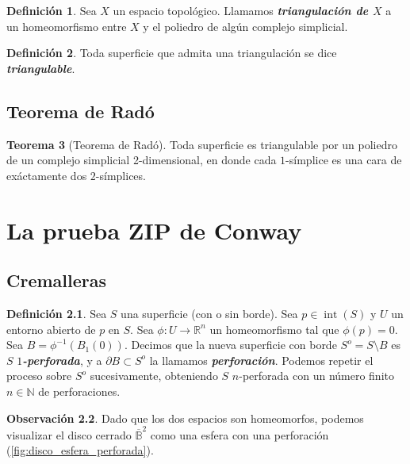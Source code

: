 \documentclass[10pt]{report}
\newcommand{\R}{\mathbb{R}}
\newcommand{\N}{\mathbb{N}}
\DeclareMathOperator{\interior}{int} %
\newcommand{\enfatiza}[1]{\textbf{\textit{#1}}}
\theoremstyle{definition}
\newtheorem{defin}{Definición}[section]
\newtheorem{tma}[defin]{Teorema}
\newtheorem{obs}[defin]{Observación}
\begin{document}
\begin{defin}%
Sea $X$ un espacio topológico. Llamamos \enfatiza{triangulación de $X$} a un homeomorfismo entre $X$ y el poliedro de algún complejo simplicial.
\end{defin}

\begin{defin}%
Toda superficie que admita una triangulación se dice \enfatiza{triangulable}.
\end{defin}



\section{Teorema de Radó}

\begin{tma}[Teorema de Radó]
Toda superficie es triangulable por un poliedro de un complejo simplicial 2-dimensional, en donde cada $1$-símplice es una cara de exáctamente dos $2$-símplices.\label{teo:rado}
\end{tma}



\chapter{La prueba ZIP de Conway}

\section{Cremalleras}

\begin{defin}%
\label{def:perforacion}
Sea $S$ una superficie (con o sin borde). Sea $p\in \interior (S)$ y $U$ un entorno abierto de $p$ en $S$. Sea $\phi :U\to \R^n$ un homeomorfismo tal que $\phi (p)=0$. Sea $B=\phi ^{-1}(B_1(0))$. Decimos que la nueva superficie con borde $S^o=S\setminus B$ es $S$ \enfatiza{$1$-perforada}, y a $\partial B\subset S^o$ la llamamos \enfatiza{perforación}. Podemos repetir el proceso sobre $S^o$ sucesivamente, obteniendo $S$ $n$-perforada con un número finito $n\in \N$ de perforaciones.
\end{defin}

\begin{obs}%
Dado que los dos espacios son homeomorfos, podemos visualizar el disco cerrado $\overline{\mathbb{B}}^2$ como una esfera con una perforación (\autoref{fig:disco_esfera_perforada}).
\end{obs}
 
\end{document}
